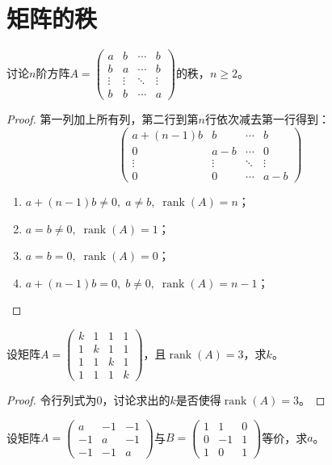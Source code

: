 \section{矩阵的秩}
\begin{theorem}
	讨论$n$阶方阵$A=
	\begin{pmatrix}
		a & b & \cdots & b \\
		b & a & \cdots & b \\
		\vdots & \vdots & \ddots & \vdots \\
		b & b & \cdots & a
	\end{pmatrix}$的秩，$n\geqslant2$。
\end{theorem}
\begin{proof}
	第一列加上所有列，第二行到第$n$行依次减去第一行得到：
	\begin{equation*}
		\begin{pmatrix}
			a+(n-1)b & b & \cdots & b \\
			0 & a-b & \cdots & 0 \\
			\vdots & \vdots & \ddots & \vdots \\
			0 & 0 & \cdots & a-b
		\end{pmatrix}
	\end{equation*}
	\begin{enumerate}
		\item $a+(n-1)b\ne0,\;a\ne b,\;\operatorname{rank}(A)=n$；
		\item $a=b\ne0,\;\operatorname{rank}(A)=1$；
		\item $a=b=0,\;\operatorname{rank}(A)=0$；
		\item $a+(n-1)b=0,\;b\ne0,\;\operatorname{rank}(A)=n-1$；
	\end{enumerate}
\end{proof}
\begin{theorem}
	设矩阵$A=
	\begin{pmatrix}
		k & 1 & 1 & 1 \\
		1 & k & 1 & 1 \\
		1 & 1 & k & 1 \\
		1 & 1 & 1 & k
	\end{pmatrix}$，且$\operatorname{rank}(A)=3$，求$k$。
\end{theorem}
\begin{proof}
	令行列式为$0$，讨论求出的$k$是否使得$\operatorname{rank}(A)=3$。
\end{proof}
\begin{theorem}
	设矩阵$A=
	\begin{pmatrix}
		a & -1 & -1 \\
		-1 & a & -1 \\
		-1 & -1 & a
	\end{pmatrix}$与$B=
	\begin{pmatrix}
		1 & 1 & 0 \\
		0 & -1 & 1 \\
		1 & 0 & 1
	\end{pmatrix}$等价，求$a$。
\end{theorem}
